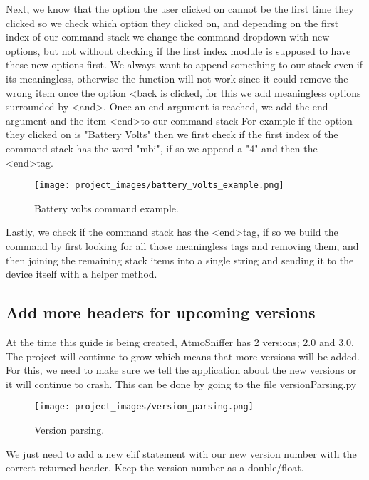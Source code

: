 	Next, we know that the option the user clicked on cannot be the first time they clicked so we check which option they clicked on, and depending on the first index of our command stack we change the command dropdown with new options, but not without checking if the first index module is supposed to have these new options first.
	We always want to append something to our stack even if its meaningless, otherwise the function will not work since it could remove the wrong item once the option \textless back is clicked, for this we add meaningless options surrounded by \textless and\textgreater.
	Once an end argument is reached, we add the end argument and the item \textless end\textgreater to our command stack
	For example if the option they clicked on is "Battery Volts" then we first check if the first index of the command stack has the word "mbi", if so we append a "4" and then the \textless end\textgreater tag.

\begin{figure}[H]
\centering
\texttt{[image: project\_images/battery\_volts\_example.png]}
 \caption{Battery volts command example.}
 \label{fig:battery volts example}
\end{figure}
	
	Lastly, we check if the command stack has the \textless end\textgreater tag, if so we build the command by first looking for all those meaningless tags and removing them, and then joining the remaining stack items into a single string and sending it to the device itself with a helper method.

\subsection{Add more headers for upcoming versions}

	At the time this guide is being created, AtmoSniffer has 2 versions; 2.0 and 3.0. The project will continue to grow which means that more versions will be added.
	For this, we need to make sure we tell the application about the new versions or it will continue to crash. This can be done by going to the file versionParsing.py

\begin{figure}[H]
\centering
\texttt{[image: project\_images/version\_parsing.png]}
 \caption{Version parsing.}
 \label{fig:version parsing}
\end{figure}

We just need to add a new elif statement with our new version number with the correct returned header. Keep the version number as a double/float.

